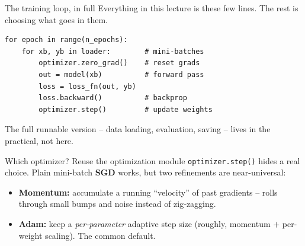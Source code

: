 \documentclass[aspectratio=169]{beamer}
\begin{document}
\begin{frame}[fragile]{The training loop, in full}
  Everything in this lecture is these few lines. The rest is choosing what goes in them.
  \vfill
{\lstset{basicstyle=\ttfamily\small}
\begin{lstlisting}
for epoch in range(n_epochs):
    for xb, yb in loader:        # mini-batches
        optimizer.zero_grad()    # reset grads
        out = model(xb)          # forward pass
        loss = loss_fn(out, yb)
        loss.backward()          # backprop
        optimizer.step()         # update weights
\end{lstlisting}}
  \vfill
  \footnotesize The full runnable version -- data loading, evaluation, saving -- lives in the
  practical, not here.
\end{frame}

\begin{frame}{Which optimizer? Reuse the optimization module}
  \texttt{optimizer.step()} hides a real choice. Plain mini-batch \textbf{SGD} works, but two
  refinements are near-universal:
  \vfill
  \begin{itemize}\small
    \item \textbf{Momentum:} accumulate a running ``velocity'' of past gradients -- rolls
      through small bumps and noise instead of zig-zagging.
    \item \textbf{Adam:} keep a \emph{per-parameter} adaptive step size (roughly, momentum $+$
      per-weight scaling). The common default.
  \end{itemize}
  \vfill
\end{frame}
\end{document}
